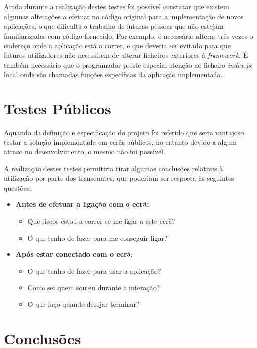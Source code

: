 	Ainda durante a realização destes testes foi possível constatar que existem algumas alterações a efetuar no código original para a implementação de novos aplicações, o que dificulta o trabalho de futuras pessoas que não estejam familiarizadas com código fornecido. Por exemplo, é necessário alterar três vezes o endereço onde a aplicação está a correr, o que deveria ser evitado para que futuros utilizadores não necessitem de alterar ficheiros exteriores à \textit{framework}. É também necessário que o programador preste especial atenção ao ficheiro \textit{index.js}, local onde são chamadas funções específicas da aplicação implementada. 

\section{Testes Públicos}

	Aquando da definição e especificação do projeto foi referido que seria vantajoso testar a solução implementada em ecrãs públicos, no entanto devido a algum atraso no desenvolvimento, o mesmo não foi possível.

	A realização destes testes permitiria tirar algumas conclusões relativas à utilização por parte dos transeuntes, que poderiam ser resposta às seguintes questões:

	\begin{itemize}
	\item \textbf{Antes de efetuar a ligação com o ecrã:}
		\begin{itemize}
		\item Que riscos estou a correr se me ligar a este ecrã?
		\item O que tenho de fazer para me conseguir ligar?
		\end{itemize}
	\item \textbf{Após estar conectado com o ecrã}:
		\begin{itemize}
		\item O que tenho de fazer para usar a aplicação?
		\item Como sei quem sou eu durante a interação?
		\item O que faço quando desejar terminar?
		\end{itemize}
	\end{itemize} 

\section{Conclusões}

